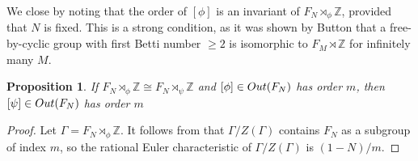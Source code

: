 \documentclass[11pt, a4 paper]{amsart}
\numberwithin{equation}{section}
\newtheorem{proposition}[theorem]{Proposition}
\theoremstyle{remark}
\theoremstyle{definition}
\def\Z{\mathbb Z}
\def\G{\Gamma}
\def\outN{{\rm{Out}}(F_N)}
\def\G{\Gamma}
\begin{document}
\bigskip

We close by noting that 
the order of $[\phi]$ is an invariant of $F_N\rtimes_\phi\Z$, 
provided that $N$ is fixed. 
This is a strong condition, 
as it was shown by Button \cite{button2007mapping} 
that a free-by-cyclic group with first Betti number $\ge 2$ 
is isomorphic to $F_M \rtimes \Z$ 
for infinitely many $M$. 

\begin{proposition}
\label{p:order-only}
	If $F_N\rtimes_\phi\Z\cong F_N\rtimes_\psi\Z$ and $[\phi]\in\outN$ has order $m$, then $[\psi]\in\outN$ has order $m$
\end{proposition}

\begin{proof} 
	Let $\G=F_N\rtimes_\phi\Z$.
	It follows from  
	that $\G/Z(\G)$ contains $F_N$ as a subgroup of index $m$, 
	so the rational Euler characteristic of $\G/Z(\G)$ 
	is $(1-N)/m$. 
\end{proof}





\end{document}
